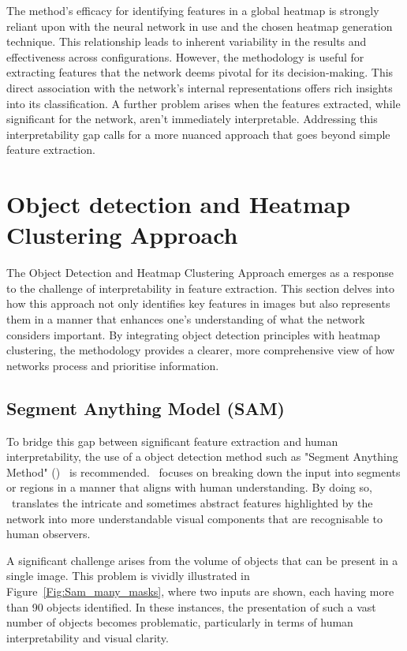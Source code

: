 The method's efficacy for identifying features in a global heatmap is strongly reliant upon with the neural network in use and the chosen heatmap generation technique. This relationship leads to inherent variability in the results and effectiveness across configurations. However, the methodology is useful for extracting features that the network deems pivotal for its decision-making. This direct association with the network's internal representations offers rich insights into its classification. A further problem arises when the features extracted, while significant for the network, aren't immediately interpretable. Addressing this interpretability gap calls for a more nuanced approach that goes beyond simple feature extraction.


\section{Object detection and Heatmap Clustering Approach}

The Object Detection and Heatmap Clustering Approach emerges as a response to the challenge of interpretability in feature extraction. This section delves into how this approach not only identifies key features in images but also represents them in a manner that enhances one's understanding of what the network considers important. By integrating object detection principles with heatmap clustering, the methodology provides a clearer, more comprehensive view of how networks process and prioritise information. 

\subsection{Segment Anything Model (SAM)}
To bridge this gap between significant feature extraction and human interpretability, the use of a object detection method such as "Segment Anything Method" (\SAM)~\cite{Kirillov2023SegmentA} is recommended. \SAM\ focuses on breaking down the input into segments or regions in a manner that aligns with human understanding. By doing so, \SAM\ translates the intricate and sometimes abstract features highlighted by the network into more understandable visual components that are recognisable to human observers.

A significant challenge arises from the volume of objects that can be present in a single image. This problem is vividly illustrated in Figure~\ref{Fig:Sam_many_masks}, where two inputs are shown, each having more than 90 objects identified. In these instances, the presentation of such a vast number of objects becomes problematic, particularly in terms of human interpretability and visual clarity.

